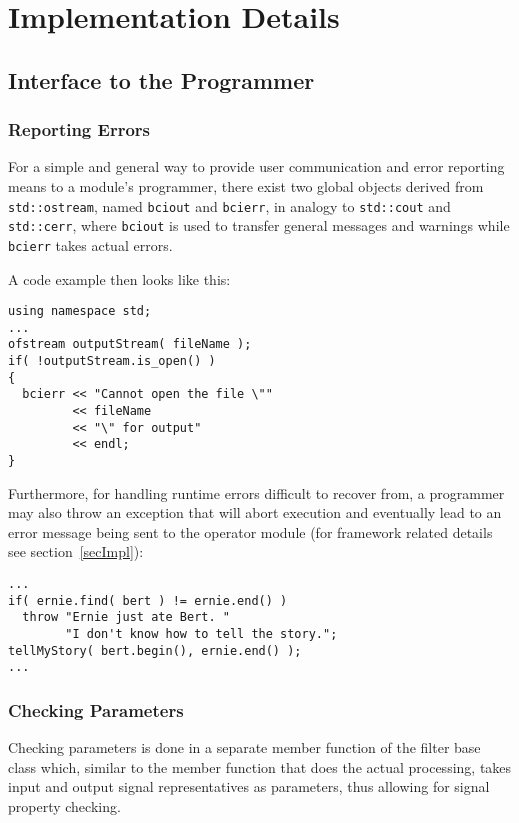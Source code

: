 \documentclass[12pt,a4paper]{article}
\begin{document}
\pagebreak
\section{Implementation Details}

\subsection{Interface to the Programmer}

\subsubsection{Reporting Errors}

For a simple and general way to provide
user communication and error reporting means to a module's
programmer, there exist two global
objects derived from \texttt{std::ostream}, named
\texttt{bciout} and \texttt{bcierr}, in analogy to
\texttt{std::cout} and \texttt{std::cerr}, where \texttt{bciout}
is used to transfer general messages and warnings while
\texttt{bcierr} takes actual errors.

A code example then looks like this:
\begin{verbatim}
using namespace std;
...
ofstream outputStream( fileName );
if( !outputStream.is_open() )
{
  bcierr << "Cannot open the file \""
         << fileName
         << "\" for output"
         << endl;
}
\end{verbatim}

Furthermore, for handling runtime errors difficult to recover
from, a programmer may also throw an exception that will abort
execution and
eventually lead to an error message being sent to the operator
module (for framework related details see section~\ref{secImpl}):
\begin{verbatim}
...
if( ernie.find( bert ) != ernie.end() )
  throw "Ernie just ate Bert. " 
        "I don't know how to tell the story.";
tellMyStory( bert.begin(), ernie.end() );
...
\end{verbatim}

\subsubsection{Checking Parameters}

Checking parameters is done in a separate member function
of the filter base class which, similar to the member function
that does the actual processing, takes input and output signal
representatives as parameters, thus allowing for signal
property checking.
\end{document}
